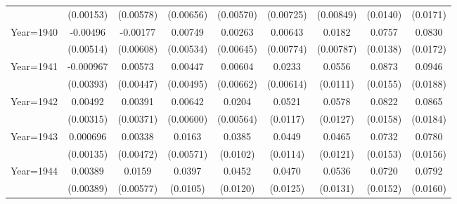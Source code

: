 \begin{table}[htbp]
\begin{tabular}{l*{8}{c}}
                    &   (0.00153)         &   (0.00578)         &   (0.00656)         &   (0.00570)         &   (0.00725)         &   (0.00849)         &    (0.0140)         &    (0.0171)         \\
[1em]
Year=1940           &    -0.00496         &    -0.00177         &     0.00749         &     0.00263         &     0.00643         &      0.0182\sym{**} &      0.0757\sym{***}&      0.0830\sym{***}\\
                    &   (0.00514)         &   (0.00608)         &   (0.00534)         &   (0.00645)         &   (0.00774)         &   (0.00787)         &    (0.0138)         &    (0.0172)         \\
[1em]
Year=1941           &   -0.000967         &     0.00573         &     0.00447         &     0.00604         &      0.0233\sym{***}&      0.0556\sym{***}&      0.0873\sym{***}&      0.0946\sym{***}\\
                    &   (0.00393)         &   (0.00447)         &   (0.00495)         &   (0.00662)         &   (0.00614)         &    (0.0111)         &    (0.0155)         &    (0.0188)         \\
[1em]
Year=1942           &     0.00492         &     0.00391         &     0.00642         &      0.0204\sym{***}&      0.0521\sym{***}&      0.0578\sym{***}&      0.0822\sym{***}&      0.0865\sym{***}\\
                    &   (0.00315)         &   (0.00371)         &   (0.00600)         &   (0.00564)         &    (0.0117)         &    (0.0127)         &    (0.0158)         &    (0.0184)         \\
[1em]
Year=1943           &    0.000696         &     0.00338         &      0.0163\sym{***}&      0.0385\sym{***}&      0.0449\sym{***}&      0.0465\sym{***}&      0.0732\sym{***}&      0.0780\sym{***}\\
                    &   (0.00135)         &   (0.00472)         &   (0.00571)         &    (0.0102)         &    (0.0114)         &    (0.0121)         &    (0.0153)         &    (0.0156)         \\
[1em]
Year=1944           &     0.00389         &      0.0159\sym{***}&      0.0397\sym{***}&      0.0452\sym{***}&      0.0470\sym{***}&      0.0536\sym{***}&      0.0720\sym{***}&      0.0792\sym{***}\\
                    &   (0.00389)         &   (0.00577)         &    (0.0105)         &    (0.0120)         &    (0.0125)         &    (0.0131)         &    (0.0152)         &    (0.0160)         \\

\end{tabular}
\end{table}
